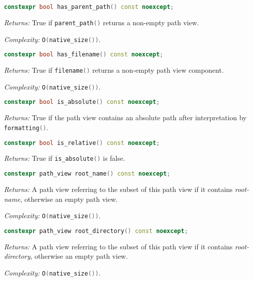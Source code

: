 \documentclass[11pt]{article}
\newcommand{\code}[2][cpp]{\lstinline[language=#1,basicstyle=\small\ttfamily]{#2}}
\newcommand{\desc}[1]{\textit{#1}}
\newcommand{\returns}{\desc{Returns: }}
\newcommand{\complexity}{\desc{Complexity: }}
\begin{document}
\begin{lstlisting}[language=cpp]
    constexpr bool has_parent_path() const noexcept;
\end{lstlisting}

\returns True if \code{parent_path()} returns a non-empty path view.

\complexity \code{O(native_size())}.\\

\begin{lstlisting}[language=cpp]
    constexpr bool has_filename() const noexcept;
\end{lstlisting}

\returns True if \code{filename()} returns a non-empty path view component.

\complexity \code{O(native_size())}.\\

\begin{lstlisting}[language=cpp]
    constexpr bool is_absolute() const noexcept;
\end{lstlisting}

\returns True if the path view contains an absolute path after interpretation by \code{formatting()}.\\

\begin{lstlisting}[language=cpp]
    constexpr bool is_relative() const noexcept;
\end{lstlisting}

\returns True if \code{is_absolute()} is false.\\

\begin{lstlisting}[language=cpp]
    constexpr path_view root_name() const noexcept;
\end{lstlisting}

\returns A path view referring to the subset of this path view if it contains \emph{root-name}, otherwise an empty path view.

\complexity \code{O(native_size())}.\\

\begin{lstlisting}[language=cpp]
    constexpr path_view root_directory() const noexcept;
\end{lstlisting}

\returns A path view referring to the subset of this path view if it contains \emph{root-directory}, otherwise an empty path view.

\complexity \code{O(native_size())}.\\
\end{document}

